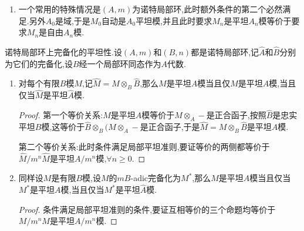\begin{enumerate}
\begin{proof}
		对每个$n>0$,由Artin-Rees引理说明对足够大的$k>n$总有$I^k\cap J\subseteq I^nJ$.考虑典范的同态:
		$$\xymatrix{J\otimes M\ar[r]^f&(J/I^k\cap J)\otimes M\ar[r]^g&(J/I^nJ)\otimes M=J\otimes M/I^n(J\otimes M)}$$
		
		按照$M_{k-1}$是$A_{k-1}=A/I^k$平坦模,映射$(J/I^k\cap J)\otimes_AM=(J/I^k\cap J)\otimes_{A_{k-1}}M_{k-1}\to M_{k-1}$是单射,我们有如下交换图:
		$$\xymatrix{J\otimes M\ar[rr]^f\ar[d]&&(J/I^k\cap J)\otimes M\ar[d]\\M\ar[rr]&&M_{k-1}}$$
		
		于是$\ker u\subset\ker(J\otimes M\to M\to M_{k-1})=\ker(gf)=I^n(J\otimes M)$.完成证明.
	\end{proof}
	\item 一个常用的特殊情况是$(A,m)$为诺特局部环,此时额外条件的第二个必然满足.另外$A_0$是域,于是$M_0$自动是$A_0$平坦模,并且此时要求$M_n$是平坦$A_n$模等价于要求$M_n$是自由$A_n$模.
\end{enumerate}

诺特局部环上完备化的平坦性.设$(A,m)$和$(B,n)$都是诺特局部环,记$\widehat{A}$和$\widehat{B}$分别为它们的完备化,设$B$经一个局部环同态作为$A$代数.
\begin{enumerate}
	\item 对每个有限$B$模$M$,记$\widehat{M}=M\otimes_B\widehat{B}$,那么$M$是平坦$A$模当且仅$\widehat{M}$是平坦$A$模,当且仅当$\widehat{M}$是平坦$\widehat{A}$模.
	\begin{proof}
		
		第一个等价关系:$M$是平坦$A$模等价于$M\otimes_A-$是正合函子,按照$\widehat{B}$是忠实平坦$B$模,这等价于$\widehat{B}\otimes_B(M\otimes_A-$是正合函子,于是$\widehat{M}=M\otimes_B\widehat{B}$是平坦$A$模.
		
		第二个等价关系:此时条件满足局部平坦准则,要证等价的两侧都等价于$\widehat{M}/m^n\widehat{M}$是平坦$A/m^n$模,$\forall n\ge0$.
	\end{proof}
	\item 同样设$M$是有限$B$模,设$M$的$mB$-adic完备化为$M^*$,那么$M$是平坦$A$模当且仅当$M^*$是平坦$A$模,当且仅当$M^*$是平坦$\widehat{A}$模.
	\begin{proof}
		
		条件满足局部平坦准则的条件,要证互相等价的三个命题均等价于$M/m^nM$是平坦$A/m^n$模.
	\end{proof}
\end{enumerate}

